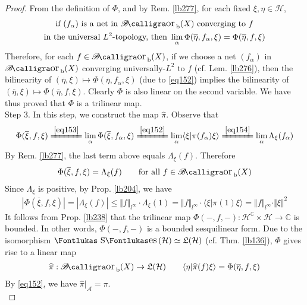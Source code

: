 \documentclass[12pt,b5paper,notitlepage]{article}
\theoremstyle{definition}
\theoremstyle{plain}
\DeclareMathOperator{\Borb}{{\mathscr{B}\text{\kern -2pt {\calligra\large or}}\,}_{\mathrm b}}
\DeclareMathOperator{\Ses}{\text{\Fontlukas S}\text{\kern -0pt {\Fontlukas\large es}}\,}
\newcommand{\fk}{\mathfrak}
\newcommand{\wht}{\widehat}
\newcommand{\ovl}{\overline}
\newcommand{\bk}[1]{\langle {#1}\rangle}
\newcommand{\scr}{\mathscr}
\newcommand{\Co}{\complement}
\newcommand{\Cbb}{\mathbb C}
\newcommand{\MH}{\mathcal H}
\numberwithin{equation}{section}
\begin{document}
\begin{proof}
From the definition of $\Phi$, and by Rem. \ref{lb277}, for each fixed $\xi,\eta\in\MH$,
\begin{gather}\label{eq153}
\begin{gathered}
\text{if $(f_\alpha)$ is a net in $\Borb(X)$ converging to $f$}\\
\text{in the universal $L^2$-topology, then }\lim_\alpha\Phi(\ovl\eta,f_\alpha,\xi)=\Phi(\ovl\eta,f,\xi)
\end{gathered}
\end{gather}
Therefore, for each $f\in\Borb(X)$, if we choose a net $(f_\alpha)$ in $\Borb(X)$ converging universally-$L^2$ to $f$ (cf. Lem. \ref{lb276}), then the bilinearity of $(\ovl\eta,\xi)\mapsto\Phi(\ovl\eta,f_\alpha,\xi)$ (due to \eqref{eq152}) implies the bilinearity of $(\ovl\eta,\xi)\mapsto\Phi(\ovl\eta,f,\xi)$. Clearly $\Phi$ is also linear on the second variable. We have thus proved that $\Phi$ is a trilinear map.\\[-1ex]


Step 3. In this step, we construct the map $\wht\pi$. Observe that
\begin{align*}
\Phi(\ovl\xi,f,\xi)\xlongequal{\eqref{eq153}}\lim_\alpha\Phi(\ovl\xi,f_\alpha,\xi)\xlongequal{\eqref{eq152}}\lim_\alpha\bk{\xi|\pi(f_\alpha)\xi}\xlongequal{\eqref{eq154}}\lim_\alpha\Lambda_\xi(f_\alpha)
\end{align*}
By Rem. \ref{lb277}, the last term above equals $\Lambda_\xi(f)$. Therefore
\begin{align}\label{eq155}
\Phi(\ovl\xi,f,\xi)=\Lambda_\xi(f)\qquad\text{for all }f\in\Borb(X)
\end{align}
Since $\Lambda_\xi$ is positive, by Prop. \ref{lb204}, we have
\begin{align*}
|\Phi(\ovl\xi,f,\xi)|=|\Lambda_\xi(f)|\leq\Vert f\Vert_{l^\infty}\cdot\Lambda_\xi(1)=\Vert f\Vert_{l^\infty}\cdot\bk{\xi|\pi(1)\xi}=\Vert f\Vert_{l^\infty}\cdot\Vert\xi\Vert^2
\end{align*}
It follows from Prop. \ref{lb238} that the trilinear map $\Phi(-,f,-):\MH^\Co\times\MH\rightarrow\Cbb$ is bounded. In other words, $\Phi(-,f,-)$ is a bounded sesquilinear form. Due to the isomorphism $\Ses(\MH)\simeq\fk L(\MH)$ (cf. Thm. \ref{lb136}), $\Phi$ gives rise to a linear map
\begin{align}\label{eq156}
\wht\pi:\Borb(X)\rightarrow\fk L(\MH)\qquad \bk{\eta|\wht\pi(f)\xi}=\Phi(\ovl\eta,f,\xi)
\end{align}
By \eqref{eq152}, we have $\wht\pi|_{\scr A}=\pi$.\\[-1ex]


\end{proof}
\end{document}

